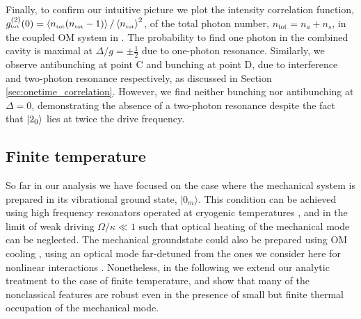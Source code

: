 Finally, to confirm our intuitive picture we plot the
intensity correlation function, 
$g^{(2)}_{\mbox{\tiny tot}}(0) =
\left< n_{\mbox{\tiny tot}}(n_{\mbox{\tiny tot}}-1) \right>/\left< n_{\mbox{\tiny tot}} \right>^2$,
of the total photon number, $n_{\text{tot}} = n_a +
n_s$,
in the coupled OM system in
. 
The probability to find one photon in the combined
cavity is maximal at $\Delta/g=\pm \frac{1}{2}$ 
due to one-photon resonance.
Similarly, we  
observe antibunching at point C
and bunching at point D,
due  to interference and two-photon resonance
respectively,
as discussed 
in Section \ref{sec:onetime_correlation}.
However, we find neither bunching nor antibunching
at $\Delta = 0$, 
demonstrating the absence of a two-photon resonance
despite the fact that $| 2_0 \rangle$ lies at twice the
drive frequency.




 


\subsection{Finite temperature}

So far in our analysis
we have focused on the case where the mechanical
system is prepared in its vibrational 
ground state, $|0_m\rangle$. 
This
condition can be achieved using high frequency resonators 
operated at cryogenic
temperatures \cite{O'Connell2010},
and in the limit of weak driving $\Omega/\kappa\ll1$ such
that optical
heating of the mechanical mode can be neglected. 
The mechanical groundstate  could also be 
prepared using OM cooling \cite{Metzger2004, Gigan2006, 
Arcizet2006, Kleckner2006, Corbitt2007, 
Schliesser2008,Thompson2008,Wilson2009,
O'Connell2010,Teufel2011,Chan2011},
using an optical mode far-detuned
from the ones we consider  here for 
nonlinear interactions
\cite{Stannigel2012}.
Nonetheless,
in the
following we extend our analytic treatment to the case of finite temperature, 
and show that many of the
nonclassical features are robust even
in the presence of small
but finite thermal occupation of the mechanical mode.


